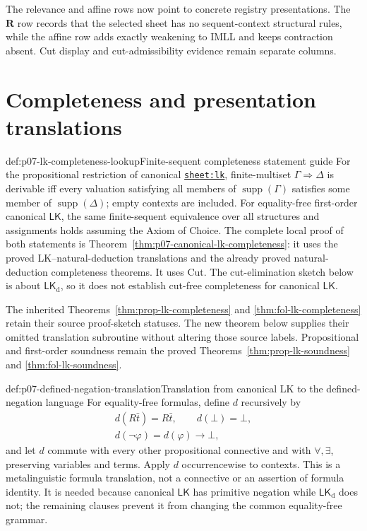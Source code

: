 The relevance and affine rows now point to concrete registry presentations.
The \(\mathbf R\) row records that the selected sheet has no sequent-context
structural rules, while the affine row adds exactly weakening to IMLL and keeps
contraction absent. Cut display and cut-admissibility evidence remain separate
columns.

\section{Completeness and presentation translations}

\begin{hbmethod}{def:p07-lk-completeness-lookup}{Finite-sequent completeness statement guide}
For the propositional restriction of canonical
\hyperref[sheet:lk]{\texttt{sheet:lk}}, finite-multiset
\(\Gamma\Rightarrow\Delta\) is derivable iff every valuation satisfying all
members of \(\operatorname{supp}(\Gamma)\) satisfies some member of
\(\operatorname{supp}(\Delta)\); empty contexts are included.  For equality-free
first-order canonical \(\mathsf{LK}\), the same finite-sequent equivalence
over all structures and assignments holds assuming the Axiom of Choice.
The complete local proof of both statements is
Theorem~\ref{thm:p07-canonical-lk-completeness}: it uses the proved
LK--natural-deduction translations and the already proved natural-deduction
completeness theorems.  It uses Cut.  The cut-elimination sketch below is about
\(\mathsf{LK}_{\mathrm d}\), so it does not establish cut-free completeness
for canonical \(\mathsf{LK}\).
\end{hbmethod}

The inherited Theorems~\ref{thm:prop-lk-completeness} and
\ref{thm:fol-lk-completeness} retain their source proof-sketch statuses.  The
new theorem below supplies their omitted translation subroutine without
altering those source labels.  Propositional and first-order soundness remain
the proved Theorems~\ref{thm:prop-lk-soundness} and
\ref{thm:fol-lk-soundness}.

\begin{hbdefinition}{def:p07-defined-negation-translation}{Translation from canonical LK to the defined-negation language}
For equality-free formulas, define \(d\) recursively by
\[
\begin{gathered}
 d(R\bar t)=R\bar t,\qquad d(\bot)=\bot,\\
 d(\neg\varphi)=d(\varphi)\to\bot,
\end{gathered}
\]
and let \(d\) commute with every other propositional connective and with
\(\forall,\exists\), preserving variables and terms.  Apply \(d\)
occurrencewise to contexts.  This is a metalinguistic formula translation,
not a connective or an assertion of formula identity.  It is needed because
canonical \(\mathsf{LK}\) has primitive negation while
\(\mathsf{LK}_{\mathrm d}\) does not; the remaining clauses prevent it from
changing the common equality-free grammar.
\end{hbdefinition}

